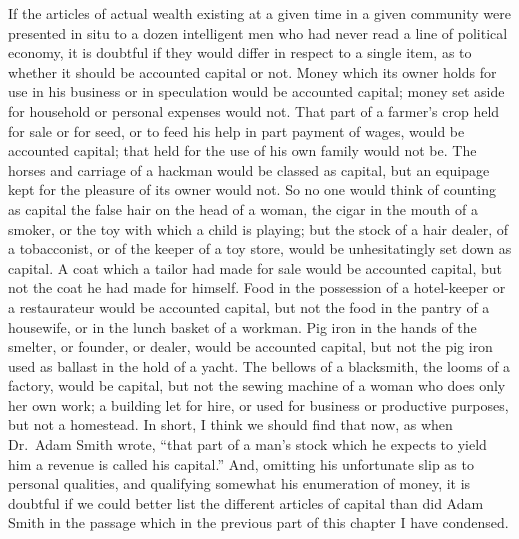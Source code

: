 If the articles of actual wealth existing at a given time in a given
community were presented in situ to a dozen intelligent men who had
never read a line of political economy, it is doubtful if they would
differ in respect to a single item, as to whether it should be accounted
capital or not. Money which its owner holds for use in his business or
in speculation would be accounted capital; money set aside for household
or personal expenses would not. That part of a farmer's crop held for
sale or for seed, or to feed his help in part payment of wages, would be
accounted capital; that held for the use of his own family would not be.
The horses and carriage of a hackman would be classed as capital, but an
equipage kept for the pleasure of its owner would not. So no one would
think of counting as capital the false hair on the head of a woman, the
cigar in the mouth of a smoker, or the toy with which a child is
playing; but the stock of a hair dealer, of a tobacconist, or of the
keeper of a toy store, would be unhesitatingly set down as capital. A
coat which a tailor had made for sale would be accounted capital, but
not the coat he had made for himself. Food in the possession of a
hotel-keeper or a restaurateur would be accounted capital, but not the
food in the pantry of a housewife, or in the lunch basket of a workman.
Pig iron in the hands of the smelter, or founder, or dealer, would be
accounted capital, but not the pig iron used as ballast in the hold of a
yacht. The bellows of a blacksmith, the looms of a factory, would be
capital, but not the sewing machine of a woman who does only her own
work; a building let for hire, or used for business or productive
purposes, but not a homestead. In short, I think we should find that
now, as when Dr.~Adam Smith wrote, ``that part of a man's stock which he
expects to yield him a revenue is called his capital.'' And, omitting
his unfortunate slip as to personal qualities, and qualifying somewhat
his enumeration of money, it is doubtful if we could better list the
different articles of capital than did Adam Smith in the passage which
in the previous part of this chapter I have condensed.


